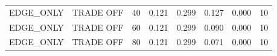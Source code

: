 \begin{table}
\begin{tabular}{llcccccc}
EDGE\_ONLY & TRADE OFF & 40 & 0.121 & 0.299 & 0.127 & 0.000 & 10 \\
EDGE\_ONLY & TRADE OFF & 60 & 0.121 & 0.299 & 0.090 & 0.000 & 10 \\
EDGE\_ONLY & TRADE OFF & 80 & 0.121 & 0.299 & 0.071 & 0.000 & 10 \\
\bottomrule
\end{tabular}
\par{}
\end{table}
